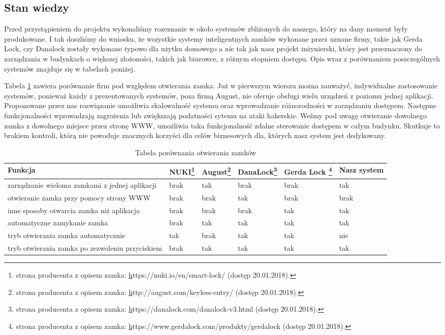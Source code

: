 \subsection{Stan wiedzy}\label{sec:Stan wiedzy}
Przed przystąpieniem do projektu wykonaliśmy rozeznanie w około systemów zbliżonych do naszego, który na dany moment były produkowane. I tak doszliśmy do wniosku, że wszystkie systemy inteligentnych zamków wykonane przez uznane firmy, takie jak Gerda Lock, czy Danalock zostały wykonane typowo dla użytku domowego a nie tak jak nasz projekt inżynierski, który jest przeznaczony do zarządzania w budynkach o większej złożoności, takich jak biurowce, z różnym stopniem dostępu. Opis wraz z porównaniem poszczególnych systemów znajduje się w tabelach poniżej.

Tabela \ref{tab:porownanie1} zawiera porównanie firm pod względem otwierania zamka. Już w pierwszym wierszu można zauważyć, indywidualne zastosowanie systemów, ponieważ każdy z prezentowanych systemów, poza firmą August, nie oferuje obsługi wielu urządzeń z poziomu jednej aplikacji. Proponowane przez nas rozwiązanie umożliwia skalowalność systemu oraz wprowadzanie różnorodności w zarządzaniu dostępem. Następne funkcjonalności wprowadzają zagrożenia lub zwiększają podatności sytemu na ataki hakerskie. Weźmy pod uwagę otwieranie dowolnego zamka z dowolnego miejsce przez stronę WWW, umożliwia taka funkcjonalność zdalne sterowanie dostępem w całym budynku. Skutkuje to brakiem kontroli, którą nie powoduje znacznych korzyści dla celów biznesowych dla, których nasz system jest dedykowany.
	\begin{longtable}[!ht]{|m{4cm}|m{1cm}|m{1cm}|m{}|m{1cm}|m{}|} 
		\caption{Tabela porównania otwierania zamków}
		\label{tab:porownanie1}\\
		\hline	
		Funkcja & NUKI\footnote{strona producenta z opisem zamka: \hyperref[strona internetowa Nuki]https://nuki.io/en/smart-lock/ (dostęp 20.01.2018).} & August\footnote{strona producenta z opisem zamka: \hyperref[strona internetowa august]http://august.com/keyless-entry/ (dostęp 20.01.2018).} & DanaLock\footnote{strona producenta z opisem zamka: \hyperref[strona internetowa DanaLock]https://danalock.com/danalock-v3.html (dostęp 20.01.2018).} &
		 Gerda Lock \footnote{strona producenta z opisem zamka: \hyperref[strona internetowa Gerda Lock]https://www.gerdalock.com/produkty/gerdalock (dostęp 20.01.2018).} & 
		 Nasz system  \\	\hline
		 zarządzanie wieloma zamkami z jednej aplikacji
		 & brak & tak & brak & brak & tak \\	\hline
		otwieranie zamka przy pomocy strony WWW
		& brak & brak & tak & brak & brak \\	\hline
		inne sposoby otwarcia zamka niż aplikacja
		& brak & brak & brak & tak & tak \\	\hline
		automatyczne zamykanie zamka
		& brak & tak & tak & tak & tak \\	\hline
		tryb otwierania zamka automatycznie
		& tak& brak & tak & tak & nie \\	\hline	
		tryb otwierania zamka po zezwoleniu przyciskiem
		& brak & tak & tak & tak & tak \\		\hline
	\end{longtable}

